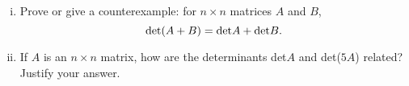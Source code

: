 \begin{question}
	\normalfont
	
\begin{enumerate}[(i)]

\item Prove or give a counterexample: for $n \times n$ matrices $A$ and $B$, 
\[
\textup{det}(A + B) = \textup{det} A + \textup{det} B.
\]	


\item If $A$ is an $n \times n$ matrix, how are the determinants det$A$ and det($5A$) related? Justify your answer.
 
 \end{enumerate}
 
\end{question}
